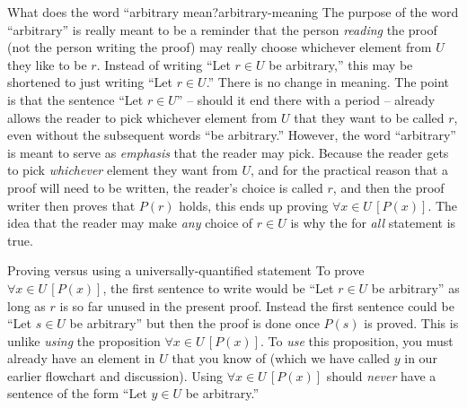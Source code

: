 \documentclass{book}
\theoremstyle{ekimcustom}
\begin{document}
\begin{blanguage}{What does the word ``arbitrary mean?}{arbitrary-meaning}
The purpose of the word ``arbitrary'' is really meant to be a reminder that the person \emph{reading} the proof (not the person writing the proof) may really choose whichever element from $U$ they like to be $r$. Instead of writing ``Let $r \in U$ be arbitrary,'' this may be shortened to just writing ``Let $r \in U$.'' There is no change in meaning. The point is that the sentence ``Let $r \in U$'' -- should it end there with a period -- already allows the reader to pick whichever element from $U$ that they want to be called $r$, even without the subsequent words ``be arbitrary.'' However, the word ``arbitrary'' is meant to serve as \emph{emphasis} that the reader may pick.
\vskip6pt
Because the reader gets to pick \emph{whichever} element they want from $U$, and for the practical reason that a proof will need to be written, the reader's choice is called $r$, and then the proof writer then proves that $P(r)$ holds, this ends up proving $\forall x \in U\,[P(x)]$. The idea that the reader may make \emph{any} choice of $r \in U$ is why the for \emph{all} statement is true.
\end{blanguage}

\begin{bwarning}{Proving versus using a universally-quantified statement}{}
To prove $\forall x \in U\,[P(x)]$, the first sentence to write would be ``Let $r \in U$ be arbitrary'' as long as $r$ is so far unused in the present proof. Instead the first sentence could be ``Let $s \in U$ be arbitrary'' but then the proof is done once $P(s)$ is proved.
\vskip6pt
This is unlike \emph{using} the proposition $\forall x \in U\,[P(x)]$. To \emph{use} this proposition, you must already have an element in $U$ that you know of (which we have called $y$ in our earlier flowchart and discussion). Using $\forall x \in U\,[P(x)]$ should \emph{never} have a sentence of the form ``Let $y \in U$ be arbitrary.''
\end{bwarning}
\end{document}
